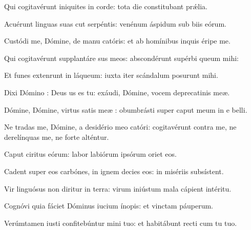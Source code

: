 \item {}

\item Qui cogitavérunt iniquites in corde:\psstar{} tota die constitubant prǽlia.

\item Acuérunt linguas suas cut serpéntis:\psstar{} venénum áspidum sub biis eórum.

\item Custódi me, Dómine, de manu catóris:\psstar{} et ab homínibus inquis éripe me.

\item Qui cogitavérunt supplantáre sus meos:\psstar{} abscondérunt supérbi queum mihi:

\item Et funes extenrunt in láqueum:\psstar{} iuxta iter scándalum posurunt mihi.

\item Dixi Dómino : Deus us es tu:\psstar{} exáudi, Dómine, vocem deprecatinis meæ.

\item Dómine, Dómine, virtus satis meæ :\psstar{} obumbrásti super caput meum in e belli.

\item Ne tradas me, Dómine, a desidério meo catóri:\psstar{} cogitavérunt contra me, ne derelínquas me, ne forte alténtur.

\item Caput ciritus eórum:\psstar{} labor labiórum ipsórum oriet eos.

\item Cadent super eos carbónes,\pscross{} in ignem decies eos:\psstar{} in misériis  subsístent.

\item Vir linguósus non diritur in terra:\psstar{} virum iniústum mala cápient  intéritu.

\item Cognóvi quia fáciet Dóminus iucium ínopis:\psstar{} et vinctam páuperum.

\item Verúmtamen iusti confitebúntur mini tuo:\psstar{} et habitábunt recti cum tu tuo.

